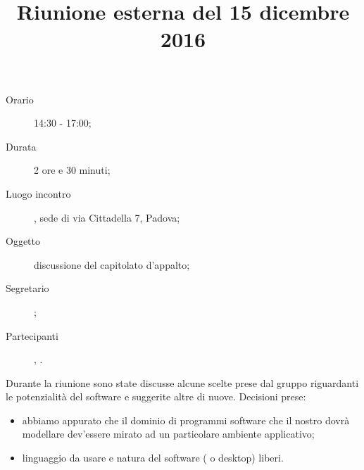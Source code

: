


\author{\PB}
\supervisor{\MM}
\title{Riunione esterna del 15 dicembre 2016}



\maketitle

\begin{description}
	\item[Orario] 14:30 - 17:00;
	\item[Durata] 2 ore e 30 minuti;
	\item[Luogo incontro] \ZU, sede di via Cittadella 7, Padova;
	\item[Oggetto] discussione del capitolato d'appalto;
	\item[Segretario] \LS; 
	\item[Partecipanti] \GP, \ALL.
\end{description}

Durante la riunione sono state discusse alcune scelte prese dal gruppo riguardanti le potenzialità del software e suggerite altre di nuove.
Decisioni prese:
\begin{itemize}
\item abbiamo appurato che il dominio di programmi software che il nostro  dovrà modellare dev'essere mirato ad un particolare ambiente applicativo; 
\item linguaggio da usare e natura del software ( o desktop) liberi.
\end{itemize}

